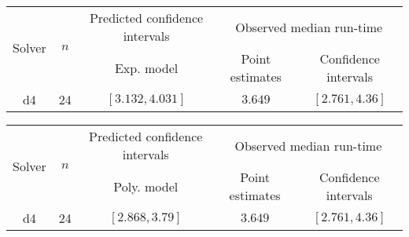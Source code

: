 \begin{tabular}{ccccc}
\hline 
\multirow{2}{*}{Solver} & \multirow{2}{*}{$n$} & Predicted confidence intervals & \multicolumn{2}{c}{Observed median  run-time}\tabularnewline
 &  & Exp. model  & Point estimates  & Confidence intervals\tabularnewline
\hline 
\hline 
\multirow{0}{*}{d4} & 24 & $\mathbf{\left[3.132,4.031\right]}$ & $3.649$ & $\left[2.761,4.36\right]$ \tabularnewline 
\hline 
\end{tabular} 

\begin{tabular}{ccccc}
\hline 
\multirow{2}{*}{Solver} & \multirow{2}{*}{$n$} & Predicted confidence intervals & \multicolumn{2}{c}{Observed median  run-time}\tabularnewline
 &  & Poly. model  & Point estimates  & Confidence intervals\tabularnewline
\hline 
\hline 
\multirow{0}{*}{d4} & 24 & $\mathbf{\left[2.868,3.79\right]}$ & $3.649$ & $\left[2.761,4.36\right]$ \tabularnewline 
\hline 
\end{tabular} 


